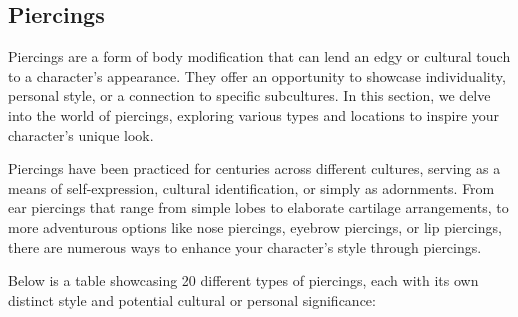 \hypertarget{piercings}{%
\subsection{Piercings}\label{piercings}}

Piercings are a form of body modification that can lend an edgy or
cultural touch to a character's appearance. They offer an opportunity to
showcase individuality, personal style, or a connection to specific
subcultures. In this section, we delve into the world of piercings,
exploring various types and locations to inspire your character's unique
look.

Piercings have been practiced for centuries across different cultures,
serving as a means of self-expression, cultural identification, or
simply as adornments. From ear piercings that range from simple lobes to
elaborate cartilage arrangements, to more adventurous options like nose
piercings, eyebrow piercings, or lip piercings, there are numerous ways
to enhance your character's style through piercings.

Below is a table showcasing 20 different types of piercings, each with
its own distinct style and potential cultural or personal significance:

